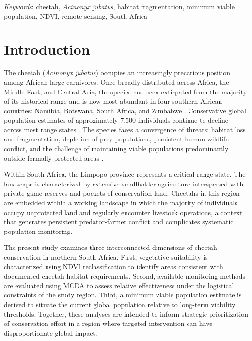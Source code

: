 \documentclass[12pt, letterpaper]{article}
\begin{document}
\bigskip
\noindent\textit{Keywords}: cheetah, \textit{Acinonyx jubatus}, habitat fragmentation,
minimum viable population, NDVI, remote sensing, South Africa

\newpage

\section{Introduction}

The cheetah (\textit{Acinonyx jubatus}) occupies an increasingly precarious position among
African large carnivores. Once broadly distributed across Africa, the Middle East, and Central
Asia, the species has been extirpated from the majority of its historical range and is now most
abundant in four southern African countries: Namibia, Botswana, South Africa, and Zimbabwe
\citep{Weise2015}. Conservative global population estimates of approximately 7,500 individuals
continue to decline across most range states \citep{Durant2017}. The species faces a
convergence of threats: habitat loss and fragmentation, depletion of prey populations,
persistent human-wildlife conflict, and the challenge of maintaining viable populations
predominantly outside formally protected areas \citep{Weise2015}.

Within South Africa, the Limpopo province represents a critical range state. The landscape is
characterized by extensive smallholder agriculture interspersed with private game reserves and
pockets of conservation land. Cheetahs in this region are embedded within a working landscape
in which the majority of individuals occupy unprotected land and regularly encounter livestock
operations, a context that generates persistent predator-farmer conflict and complicates
systematic population monitoring.

The present study examines three interconnected dimensions of cheetah conservation in northern
South Africa. First, vegetative suitability is characterized using NDVI reclassification to
identify areas consistent with documented cheetah habitat requirements. Second, available
monitoring methods are evaluated using MCDA to assess relative effectiveness under the
logistical constraints of the study region. Third, a minimum viable population estimate is derived
to situate the current global population relative to long-term viability thresholds. Together,
these analyses are intended to inform strategic prioritization of conservation effort in a region
where targeted intervention can have disproportionate global impact.
\end{document}
